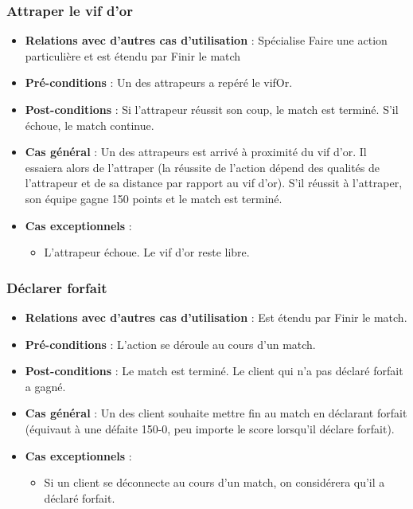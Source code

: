 \documentclass[a4paper,titlepage]{scrreprt}
\begin{document}
    \subsubsection{Attraper le vif d'or}
      \begin{itemize}
        \item \textbf{Relations avec d'autres cas d'utilisation}  : Spécialise Faire une action particulière et est étendu par Finir le match
        \item \textbf{Pré-conditions} : Un des \gls{attrapeur}s  a repéré le \gls{vifOr}.
        \item \textbf{Post-conditions} : Si l'attrapeur réussit son coup, le match est terminé. S'il échoue, le match continue.
        \item \textbf{Cas général} : Un des attrapeurs est arrivé à proximité du vif d'or. Il essaiera alors de l’attraper (la réussite de l’action dépend des qualités de l’attrapeur et de sa distance par rapport au vif d’or). S’il réussit à l’attraper, son équipe gagne 150 points et le match est terminé.
        \item \textbf{Cas exceptionnels} :
         \begin{itemize}
            \item L'attrapeur échoue. Le vif d'or reste libre.    
        \end{itemize}
      \end{itemize}

    \subsubsection{Déclarer forfait}
      \begin{itemize}
        \item \textbf{Relations avec d'autres cas d'utilisation}  : Est étendu par Finir le match.
        \item \textbf{Pré-conditions} : L'action se déroule au cours d'un match.
        \item \textbf{Post-conditions} : Le match est terminé. Le client qui n'a pas déclaré forfait a gagné.
        \item \textbf{Cas général} : Un des client souhaite mettre fin au match en déclarant forfait (équivaut à une défaite 150-0, peu importe le score lorsqu’il déclare forfait).
        \item \textbf{Cas exceptionnels} :
          \begin{itemize}
            \item Si un client se déconnecte au cours d’un match, on considérera qu’il a déclaré forfait.
          \end{itemize}
      \end{itemize}
\end{document}
